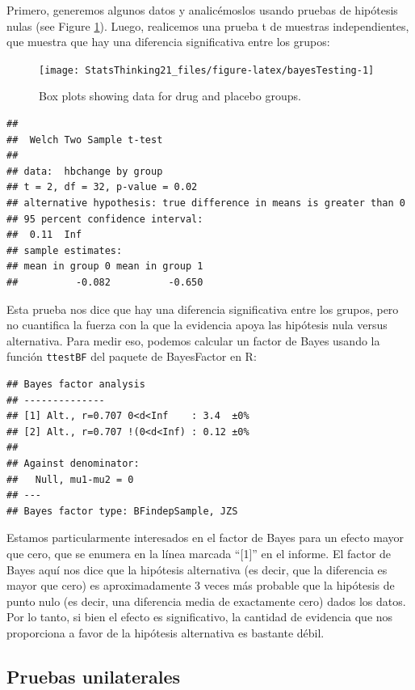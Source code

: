 \documentclass[
  12pt,
]{book}
\theoremstyle{definition}
\theoremstyle{definition}
\theoremstyle{definition}
\theoremstyle{remark}
\begin{document}
Primero, generemos algunos datos y analicémoslos usando pruebas de hipótesis nulas (see Figure \ref{fig:bayesTesting}). Luego, realicemos una prueba t de muestras independientes, que muestra que hay una diferencia significativa entre los grupos:

\begin{figure}
\texttt{[image: StatsThinking21\_files/figure-latex/bayesTesting-1]} \caption{Box plots showing data for drug and placebo groups.}\label{fig:bayesTesting}
\end{figure}

\begin{verbatim}
## 
## 	Welch Two Sample t-test
## 
## data:  hbchange by group
## t = 2, df = 32, p-value = 0.02
## alternative hypothesis: true difference in means is greater than 0
## 95 percent confidence interval:
##  0.11  Inf
## sample estimates:
## mean in group 0 mean in group 1 
##          -0.082          -0.650
\end{verbatim}

Esta prueba nos dice que hay una diferencia significativa entre los grupos, pero no cuantifica la fuerza con la que la evidencia apoya las hipótesis nula versus alternativa. Para medir eso, podemos calcular un factor de Bayes usando la función \texttt{ttestBF} del paquete de BayesFactor en R:

\begin{verbatim}
## Bayes factor analysis
## --------------
## [1] Alt., r=0.707 0<d<Inf    : 3.4  ±0%
## [2] Alt., r=0.707 !(0<d<Inf) : 0.12 ±0%
## 
## Against denominator:
##   Null, mu1-mu2 = 0 
## ---
## Bayes factor type: BFindepSample, JZS
\end{verbatim}

Estamos particularmente interesados en el factor de Bayes para un efecto mayor que cero, que se enumera en la línea marcada ``{[}1{]}'' en el informe. El factor de Bayes aquí nos dice que la hipótesis alternativa (es decir, que la diferencia es mayor que cero) es aproximadamente 3 veces más probable que la hipótesis de punto nulo (es decir, una diferencia media de exactamente cero) dados los datos. Por lo tanto, si bien el efecto es significativo, la cantidad de evidencia que nos proporciona a favor de la hipótesis alternativa es bastante débil.

\hypertarget{pruebas-unilaterales}{%
\subsection{Pruebas unilaterales}\label{pruebas-unilaterales}}
\end{document}
